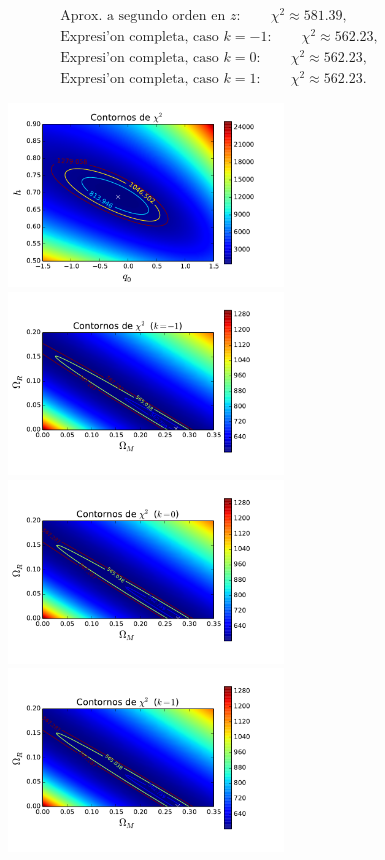 \begin{eqnarray}
\mbox{Aprox. a segundo orden en $z$}: \qquad \chi^2\approx581.39,\\
\mbox{Expresi'on completa, caso $k=-1$}: \qquad \chi^2\approx 562.23,\\
\mbox{Expresi'on completa, caso $k=0$}:  \qquad \chi^2\approx 562.23,\\
\mbox{Expresi'on completa, caso $k=1$}:  \qquad \chi^2\approx 562.23.
\end{eqnarray}
\begin{figure}[h]
  \centering
\includegraphics[width=0.65\textwidth]{fig/contornoq0.pdf}
\includegraphics[width=0.65\textwidth]{fig/contornok-1.pdf}
\includegraphics[width=0.65\textwidth]{fig/contornok0.pdf}
\includegraphics[width=0.65\textwidth]{fig/contornok1.pdf}

\end{figure}
